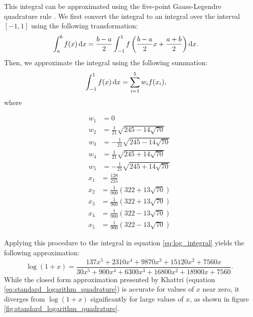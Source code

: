 This integral can be approximated using the five-point Gauss-Legendre quadrature rule \cite{kythe_quadrature_2002}. We first convert the integral to an integral over the interval $[-1,1]$ using the following transformation:
\begin{align*}
	\int_a^b{f(x)\mathop{}\!\mathrm{d} x}
	&= \frac{b-a}{2}\int_{-1}^{1}{f\left(\frac{b-a}{2}x+\frac{a+b}{2}\right)\mathop{}\!\mathrm{d} x}.
\end{align*}
Then, we approximate the integral using the following summation:
\begin{align*}
	\int_{-1}^{1}{f(x)\mathop{}\!\mathrm{d} x} &= \sum_{i=1}^{5}{w_if(x_i)},
\end{align*}
where
\begin{multicols}{2}
	\noindent
	\begin{align*}
		w_1 &= 0\\
		w_2 &= \frac{1}{21}\sqrt{245-14\sqrt{70}}\\
		w_3 &= -\frac{1}{21}\sqrt{245-14\sqrt{70}}\\
		w_4 &= \frac{1}{21}\sqrt{245+14\sqrt{70}}\\
		w_5 &= -\frac{1}{21}\sqrt{245+14\sqrt{70}}
	\end{align*}
	\columnbreak
	\begin{align*}
		x_1 &= \frac{128}{225}\\
		x_2 &= \frac{1}{900}\left( 322 + 13\sqrt{70}\right)\\
		x_3 &= \frac{1}{900}\left( 322 + 13\sqrt{70}\right)\\
		x_4 &= \frac{1}{900}\left( 322 - 13\sqrt{70}\right)\\
		x_5 &= \frac{1}{900}\left( 322 - 13\sqrt{70}\right)
	\end{align*}
\end{multicols}
Applying this procedure to the integral in equation \ref{eq:log_integral} yields the following approximation:
\begin{equation}\label{eq:standard_logarithm_quadrature}
	\log(1+x) =
	\frac{137x^5 + 2310x^4 + 9870x^3 + 15120x^2 + 7560x}
	{30x^5 + 900x^4 + 6300x^3 + 16800x^2 + 18900x + 7560}.
\end{equation}
While the closed form approximation presented by Khattri (equation \ref{eq:standard_logarithm_quadrature}) is accurate for values of $x$ near zero, it diverges from $\log{(1+x)}$ significantly for large values of $x$, as shown in figure \ref{fig:standard_logarithm_quadrature}.
